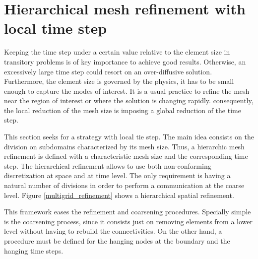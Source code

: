 
\chapter{Hierarchical mesh refinement with local time step}
\label{mesh_refinement}


Keeping the time step under a certain value relative to the element size in transitory problems is of key importance to achieve good results. Otherwise, an excessively large time step could resort on an over-diffusive solution.
Furthermore, the element size is governed by the physics, it has to be small enough to capture the modes of interest. It is a usual practice to refine the mesh near the region of interest or where the solution is changing rapidly. consequently, the local reduction of the mesh size is imposing a global reduction of the time step.

This section seeks for a strategy with local tie step. The main idea consists on the division on subdomains characterized by its mesh size. Thus, a hierarchic mesh refinement is defined with a characteristic mesh size and the corresponding time step. The hierarchical refinement allows to use both non-conforming discretization at space and at time level. The only requirement is having a natural number of divisions in order to perform a communication at the coarse level. Figure \ref{multigrid_refinement} shows a hierarchical spatial refinement.

This framework eases the refinement and coarsening procedures. Specially simple is the coarsening process, since it consists just on removing elements from a lower level without having to rebuild the connectivities. On the other hand, a procedure must be defined for the hanging nodes at the boundary and the hanging time steps.



